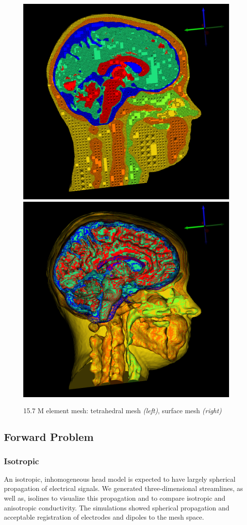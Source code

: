 \begin{figure}[H]
\begin{center}
\includegraphics[width=.49\textwidth]{Figures/smallmesh_2}
\includegraphics[width=.49\textwidth]{Figures/smallmesh_surface}
\caption{15.7 M element mesh: tetrahedral mesh \textit{(left)}, surface mesh \textit{(right)}}
\label{fig:smallmesh}
\end{center}
\end{figure}

\subsection{Forward Problem}

\subsubsection{Isotropic}

An isotropic, inhomogeneous head model is expected to have largely spherical propagation of electrical signals. We generated three-dimensional streamlines, as well as, isolines to visualize this propagation and to compare isotropic and anisotropic conductivity. The simulations showed spherical propagation and acceptable registration of electrodes and dipoles to the mesh space.

